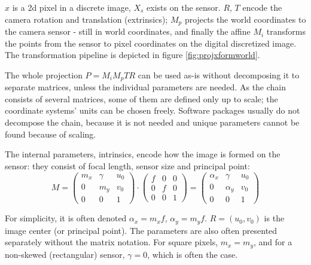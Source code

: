 $x$ is a 2d pixel in a discrete image, $X_s$ exists on the sensor.
$R$, $T$ encode the camera rotation and translation (extrinsics);
$M_p$ projects the world coordinates to the camera sensor - still in world coordinates, and finally the affine $M_i$ transforms the points from the sensor to pixel coordinates on the digital discretized image.
The transformation pipeline is depicted in figure \ref{fig:projxformworld}.



The whole projection $P = M_i M_p T R$ can be used as-is without decomposing it to separate matrices, unless the individual parameters are needed. As the chain consists of several matrices, some of them are defined only up to scale; the coordinate systems' units can be chosen freely. Software packages usually do not decompose the chain, because it is not needed and unique parameters cannot be found because of scaling.


The internal parameters, intrinsics, encode how the image is formed on the sensor: they consist of focal length, sensor size and principal point:
\begin{equation}
	M =
	\begin{pmatrix}
		m_x & \gamma & u_0\\
		0   &    m_y & v_0\\
		0   &        0 & 1
	\end{pmatrix}
\cdot
	\begin{pmatrix}
		f & 0 & 0\\
		0 & f & 0\\
		0 & 0 & 1
	\end{pmatrix}
	=
	\begin{pmatrix}
		\alpha_x & \gamma   & u_0\\
		0        & \alpha_y & v_0\\
		0        & 0        & 1
	\end{pmatrix}
\end{equation}

For simplicity, it is often denoted $\alpha_x = m_x f$, $\alpha_y = m_y f$.
$R = (u_0, v_0)$ is the image center (or principal point).
The parameters are also often presented separately without the matrix notation.
For square pixels, $m_x = m_y$, and for a non-skewed (rectangular) sensor, $\gamma = 0$, which is often the case. \cite{hartley03multiview,szeliski10vision,heyden2005multiple}

